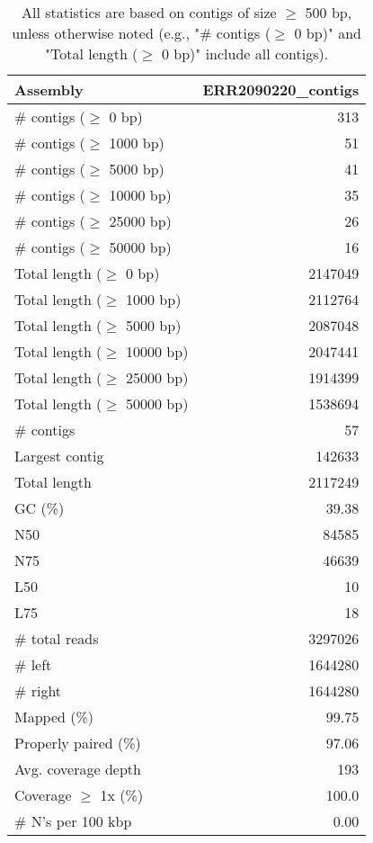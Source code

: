 \documentclass[12pt,a4paper]{article}
\begin{document}
\begin{table}[ht]
\begin{center}
\caption{All statistics are based on contigs of size $\geq$ 500 bp, unless otherwise noted (e.g., "\# contigs ($\geq$ 0 bp)" and "Total length ($\geq$ 0 bp)" include all contigs).}
\begin{tabular}{|l*{1}{|r}|}
\hline
Assembly & ERR2090220\_contigs \\ \hline
\# contigs ($\geq$ 0 bp) & 313 \\ \hline
\# contigs ($\geq$ 1000 bp) & 51 \\ \hline
\# contigs ($\geq$ 5000 bp) & 41 \\ \hline
\# contigs ($\geq$ 10000 bp) & 35 \\ \hline
\# contigs ($\geq$ 25000 bp) & 26 \\ \hline
\# contigs ($\geq$ 50000 bp) & 16 \\ \hline
Total length ($\geq$ 0 bp) & 2147049 \\ \hline
Total length ($\geq$ 1000 bp) & 2112764 \\ \hline
Total length ($\geq$ 5000 bp) & 2087048 \\ \hline
Total length ($\geq$ 10000 bp) & 2047441 \\ \hline
Total length ($\geq$ 25000 bp) & 1914399 \\ \hline
Total length ($\geq$ 50000 bp) & 1538694 \\ \hline
\# contigs & 57 \\ \hline
Largest contig & 142633 \\ \hline
Total length & 2117249 \\ \hline
GC (\%) & 39.38 \\ \hline
N50 & 84585 \\ \hline
N75 & 46639 \\ \hline
L50 & 10 \\ \hline
L75 & 18 \\ \hline
\# total reads & 3297026 \\ \hline
\# left & 1644280 \\ \hline
\# right & 1644280 \\ \hline
Mapped (\%) & 99.75 \\ \hline
Properly paired (\%) & 97.06 \\ \hline
Avg. coverage depth & 193 \\ \hline
Coverage $\geq$ 1x (\%) & 100.0 \\ \hline
\# N's per 100 kbp & 0.00 \\ \hline
\end{tabular}
\end{center}
\end{table}
\end{document}
